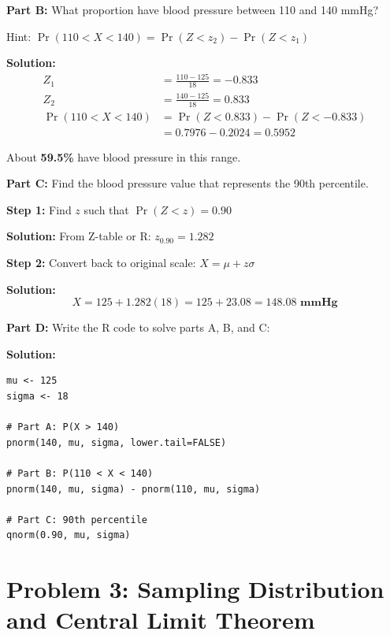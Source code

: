 \documentclass[11pt]{article}
\begin{document}
\vspace{0.5cm}

\textbf{Part B:} What proportion have blood pressure between 110 and 140 mmHg?

Hint: $\Pr(110 < X < 140) = \Pr(Z < z_2) - \Pr(Z < z_1)$

\textcolor{correctgreen}{\textbf{Solution:}}
\begin{align*}
Z_1 &= \frac{110 - 125}{18} = -0.833\\
Z_2 &= \frac{140 - 125}{18} = 0.833\\
\Pr(110 < X < 140) &= \Pr(Z < 0.833) - \Pr(Z < -0.833)\\
&= 0.7976 - 0.2024 = \mathbf{0.5952}
\end{align*}

About \textbf{59.5\%} have blood pressure in this range.

\vspace{0.5cm}

\textbf{Part C:} Find the blood pressure value that represents the 90th percentile.

\textbf{Step 1:} Find $z$ such that $\Pr(Z < z) = 0.90$

\textcolor{correctgreen}{\textbf{Solution:}} From Z-table or R: $z_{0.90} = 1.282$

\textbf{Step 2:} Convert back to original scale: $X = \mu + z\sigma$

\textcolor{correctgreen}{\textbf{Solution:}}
$$X = 125 + 1.282(18) = 125 + 23.08 = \mathbf{148.08 \text{ mmHg}}$$

\vspace{0.5cm}

\textbf{Part D:} Write the R code to solve parts A, B, and C:

\textcolor{correctgreen}{\textbf{Solution:}}
\begin{verbatim}
mu <- 125
sigma <- 18

# Part A: P(X > 140)
pnorm(140, mu, sigma, lower.tail=FALSE)

# Part B: P(110 < X < 140)
pnorm(140, mu, sigma) - pnorm(110, mu, sigma)

# Part C: 90th percentile
qnorm(0.90, mu, sigma)
\end{verbatim}

\newpage

\section{Problem 3: Sampling Distribution and Central Limit Theorem}
\end{document}

